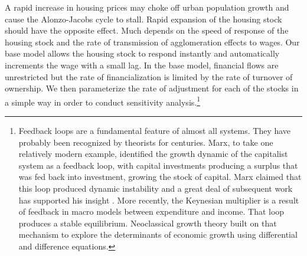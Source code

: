 A rapid increase in housing prices may choke off urban population growth and cause the \Gls{Alonzo-Jacobs cycle} to stall. Rapid expansion of the housing stock should have the opposite effect. Much depends on the speed of response of the housing stock and the rate of transmission of agglomeration effects to wages. Our base model allows the housing stock to respond instantly and automatically increments the wage with a small lag. In the base model, financial flows are unrestricted but the rate of financialization is limited by the rate of turnover of ownership. We then parameterize the rate of adjustment for each of the stocks in a simple way in order to conduct sensitivity analysis.\footnote{Feedback loops are a fundamental feature of almost all systems. They have probably been recognized by theorists for centuries. Marx, to take one relatively modern example, identified the growth dynamic of the capitalist system  as a feedback loop, with capital investments producing a surplus that was fed back into investment, growing the stock of capital. Marx claimed that this loop produced dynamic instability and a great deal of subsequent work has supported his insight \cite{dumenilStabilityInstabilityDynamic1986} \cite{schumpeterInstabilityCapitalism1928}. More recently, the Keynesian multiplier is a result of feedback in macro models between expenditure and income. That loop produces a stable equilibrium. Neoclassical growth theory built on that mechanism to explore the determinants of economic growth using differential and difference equations. %
}


